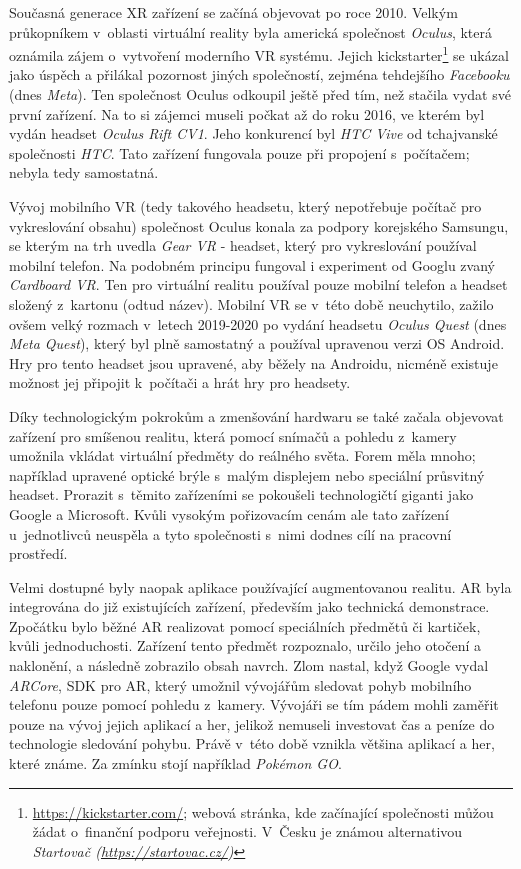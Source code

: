 Současná generace XR zařízení se začíná objevovat po roce 2010. Velkým průkopníkem v~oblasti virtuální reality byla americká společnost \textit{Oculus}, která oznámila zájem o~vytvoření moderního VR systému. Jejich kickstarter\footnote{\url{https://kickstarter.com/}; webová stránka, kde začínající společnosti můžou žádat o~finanční podporu veřejnosti. V~Česku je známou alternativou \em Startovač (\url{https://startovac.cz/})} se ukázal jako úspěch a přilákal pozornost jiných společností, zejména tehdejšího \textit{Facebooku} (dnes \textit{Meta}). Ten společnost Oculus odkoupil ještě před tím, než stačila vydat své první zařízení. Na to si zájemci museli počkat až do roku 2016, ve kterém byl vydán headset \textit{Oculus Rift CV1}. Jeho konkurencí byl \textit{HTC Vive} od tchajvanské společnosti \textit{HTC}. Tato zařízení fungovala pouze při propojení s~počítačem; nebyla tedy samostatná. \cite{otechnice_3}

Vývoj mobilního VR (tedy takového headsetu, který nepotřebuje počítač pro vykreslování obsahu) společnost Oculus konala za podpory korejského Samsungu, se kterým na trh uvedla \textit{Gear VR} - headset, který pro vykreslování používal mobilní telefon. Na podobném principu fungoval i experiment od Googlu zvaný \textit{Cardboard VR}. Ten pro virtuální realitu používal pouze mobilní telefon a headset složený z~kartonu (odtud název). Mobilní VR se v~této době neuchytilo, zažilo ovšem velký rozmach v~letech 2019-2020 po vydání headsetu \textit{Oculus Quest} (dnes \textit{Meta Quest}), který byl plně samostatný a používal upravenou verzi OS Android. Hry pro tento headset jsou upravené, aby běžely na Androidu, nicméně existuje možnost jej připojit k~počítači a hrát hry pro  headsety. \cite{otechnice_3}

Díky technologickým pokrokům a zmenšování hardwaru se také začala objevovat zařízení pro smíšenou realitu, která pomocí snímačů a pohledu z~kamery umožnila vkládat virtuální předměty do reálného světa. Forem měla mnoho; například upravené optické brýle s~malým displejem nebo speciální průsvitný headset. Prorazit s~těmito zařízeními se pokoušeli technologičtí giganti jako Google a Microsoft. Kvůli vysokým pořizovacím cenám ale tato zařízení u~jednotlivců neuspěla a tyto společnosti s~nimi dodnes cílí na pracovní prostředí. \cite{google_glass_mobilenet}

Velmi dostupné byly naopak aplikace používající augmentovanou realitu. AR byla integrována do již existujících zařízení, především jako technická demonstrace. Zpočátku bylo běžné AR realizovat pomocí speciálních předmětů či kartiček, kvůli jednoduchosti. Zařízení tento předmět rozpoznalo, určilo jeho otočení a naklonění, a následně zobrazilo obsah navrch. Zlom nastal, když Google vydal \textit{ARCore}, \gls{SDK} pro AR, který umožnil vývojářům sledovat pohyb mobilního telefonu pouze pomocí pohledu z~kamery. Vývojáři se tím pádem mohli zaměřit pouze na vývoj jejich aplikací a her, jelikož nemuseli investovat čas a peníze do technologie sledování pohybu. Právě v~této době vznikla většina aplikací a her, které známe. Za zmínku stojí například \textit{Pokémon GO}. \cite{enwiki:1182789097}


